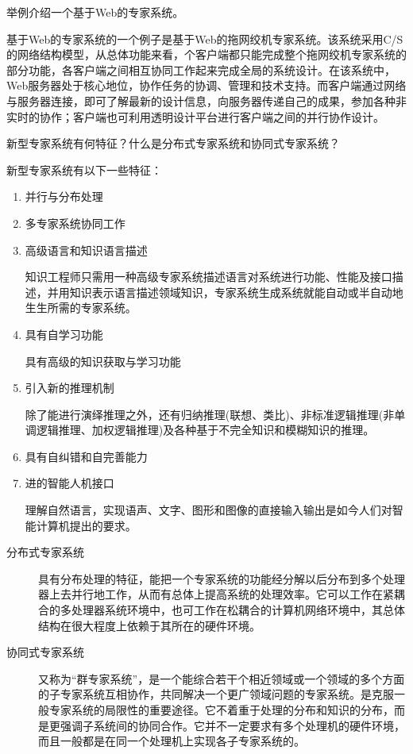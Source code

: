 \begin{question}
举例介绍一个基于Web的专家系统。
\end{question}
\begin{solution}
基于Web的专家系统的一个例子是基于Web的拖网绞机专家系统。该系统采用C/S的网络结构模型，从总体功能来看，个客户端都只能完成整个拖网绞机专家系统的部分功能，各客户端之间相互协同工作起来完成全局的系统设计。在该系统中，Web服务器处于核心地位，协作任务的协调、管理和技术支持。而客户端通过网络与服务器连接，即可了解最新的设计信息，向服务器传递自己的成果，参加各种非实时的协作；客户端也可利用透明设计平台进行客户端之间的并行协作设计。
\end{solution}

\begin{question}
新型专家系统有何特征？什么是分布式专家系统和协同式专家系统？ 
\end{question}
\begin{solution}
新型专家系统有以下一些特征：
	\begin{enumerate}
		\item 并行与分布处理
		\item 多专家系统协同工作
		\item 高级语言和知识语言描述 \par
		知识工程师只需用一种高级专家系统描述语言对系统进行功能、性能及接口描述，并用知识表示语言描述领域知识，专家系统生成系统就能自动或半自动地生生所需的专家系统。
		\item 具有自学习功能 \par
		具有高级的知识获取与学习功能 
		\item 引入新的推理机制 \par
		除了能进行演绎推理之外，还有归纳推理(联想、类比)、非标准逻辑推理(非单调逻辑推理、加权逻辑推理)及各种基于不完全知识和模糊知识的推理。
		\item 具有自纠错和自完善能力 
		\item 进的智能人机接口 \par
		理解自然语言，实现语声、文字、图形和图像的直接输入输出是如今人们对智能计算机提出的要求。 
	\end{enumerate}
	\begin{description}
		\item[分布式专家系统]
		具有分布处理的特征，能把一个专家系统的功能经分解以后分布到多个处理器上去并行地工作，从而有总体上提高系统的处理效率。它可以工作在紧耦合的多处理器系统环境中，也可工作在松耦合的计算机网络环境中，其总体结构在很大程度上依赖于其所在的硬件环境。 
		\item[协同式专家系统]
		又称为“群专家系统”，是一个能综合若干个相近领域或一个领域的多个方面的子专家系统互相协作，共同解决一个更广领域问题的专家系统。是克服一般专家系统的局限性的重要途径。它不着重于处理的分布和知识的分布，而是更强调子系统间的协同合作。它并不一定要求有多个处理机的硬件环境，而且一般都是在同一个处理机上实现各子专家系统的。
	\end{description}
\end{solution}

